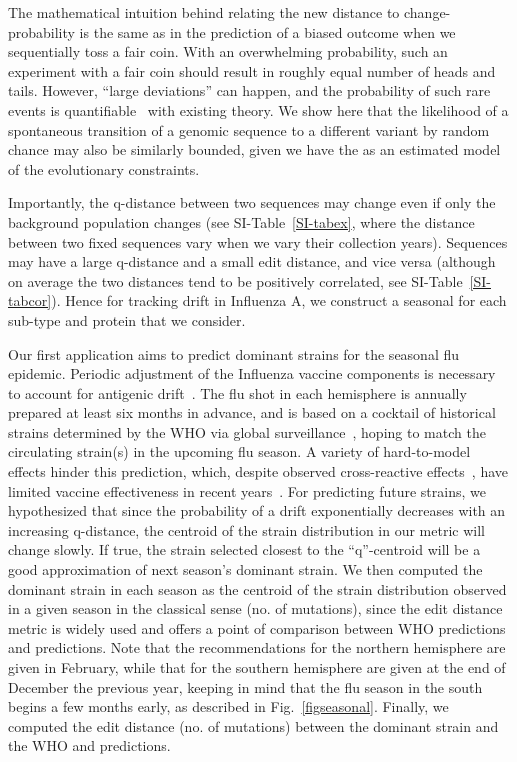 \documentclass[onecolumn, compsoc,10pt]{IEEEtran}
\begin{document}
The mathematical intuition behind relating the new distance to change-probability  is the same as in the prediction of  a biased outcome when we sequentially toss a fair coin. With an overwhelming probability, such an experiment with a fair coin should result in roughly equal number of heads and tails. However, ``large deviations'' can happen, and the probability of such rare events is quantifiable~\cite{varadhan2010large} with existing theory. We show here that the likelihood of a spontaneous transition of a genomic sequence to a  different variant by random chance may also be similarly bounded, given we have the \qnet as  an estimated model of the evolutionary constraints.

Importantly, the q-distance  between two sequences may change even if only the background population changes (see SI-Table~\ref{SI-tabex}, where  the distance between two  fixed sequences vary when we vary their collection years). Sequences may have a large q-distance and a small edit distance, and vice versa (although on average the two distances tend to be positively correlated, see SI-Table~\ref{SI-tabcor}).  Hence for tracking drift in Influenza A, we construct a seasonal \qnet for each sub-type and protein that we consider.

Our first application aims to predict dominant strains for the seasonal flu epidemic. Periodic adjustment of the Influenza vaccine components is necessary to account for antigenic drift~\cite{boni2008vaccination,dos2016influenza}. The flu shot in each hemisphere is annually prepared at least six months in advance, and is based on a cocktail of historical strains determined by the WHO via global surveillance~\cite{agor2018models}, hoping to match the circulating strain(s) in the upcoming flu season. A variety of hard-to-model effects hinder this prediction, which, despite observed cross-reactive effects~\cite{tricco2013comparing}, have limited vaccine effectiveness in recent years~\cite{cdceff}. For predicting future strains, we hypothesized that since the probability of a drift exponentially decreases with an increasing q-distance, the centroid of the strain distribution in our metric will change slowly. If true, the strain selected closest to the ``q''-centroid will be a good approximation of next season's dominant strain. We then computed the dominant strain in each season as the centroid of the strain distribution observed in a given season in the classical sense (no. of mutations), since the edit distance metric is widely used and offers a point of comparison between WHO predictions and \qnet predictions. Note that the recommendations for the northern hemisphere are given in February, while that for the southern hemisphere are given at the end of December the previous year, keeping in mind that the flu season in the south begins a few months early, as described in Fig.~\ref{figseasonal}. Finally, we computed the edit distance (no. of mutations) between the dominant strain and the WHO and \qnet predictions.
\end{document}

